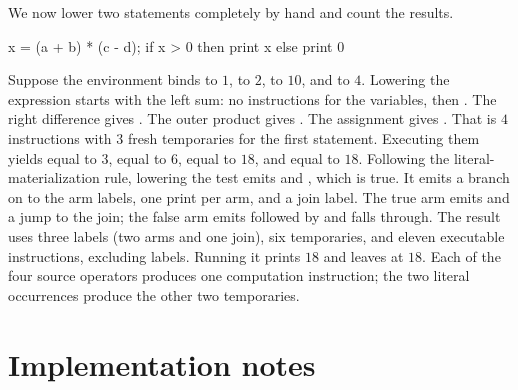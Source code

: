 We now lower two statements completely by hand and count the results.
\begin{irlisting}
x = (a + b) * (c - d);
if x > 0 then print x else print 0
\end{irlisting}
Suppose the environment binds  to $1$,  to $2$,  to $10$, and  to $4$.
Lowering the expression starts with the left sum: no instructions for the variables, then .
The right difference gives .
The outer product gives .
The assignment gives .
That is $4$ instructions with $3$ fresh temporaries for the first statement.
Executing them yields  equal to $3$,  equal to $6$,  equal to $18$, and  equal to $18$.
Following the literal-materialization rule, lowering the test emits  and , which is true.
It emits a branch on  to the arm labels, one print per arm, and a join label.
The true arm emits  and a jump to the join; the false arm emits  followed by  and falls through.
The result uses three labels (two arms and one join), six temporaries, and eleven executable instructions, excluding labels.
Running it prints $18$ and leaves  at $18$.
Each of the four source operators produces one computation instruction; the two literal occurrences produce the other two temporaries.

\section{Implementation notes}
\label{sec:ch06-implementation}

